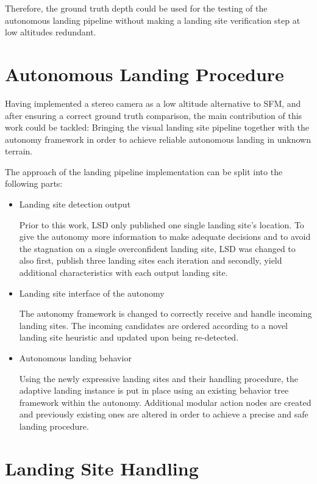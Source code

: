 Therefore, the ground truth depth could be used for the testing of the autonomous landing pipeline without making a landing site verification step at low altitudes redundant.


\section{Autonomous Landing Procedure}

Having implemented a stereo camera as a low altitude alternative to SFM, and after ensuring a correct ground truth comparison, the main contribution of this work could be tackled: Bringing the visual landing site pipeline together with the autonomy framework in order to achieve reliable autonomous landing in unknown terrain.

The approach of the landing pipeline implementation can be split into the following parts:

\begin{itemize}
    \item Landing site detection output

    Prior to this work, LSD only published one single landing site's location. To give the autonomy more information to make adequate decisions and to avoid the stagnation on a single overconfident landing site, LSD was changed to also first, publish three landing sites each iteration and secondly, yield additional characteristics with each output landing site.
    \item Landing site interface of the autonomy

    The autonomy framework is changed to correctly receive and handle incoming landing sites. The incoming candidates are ordered according to a novel landing site heuristic and updated upon being re-detected.
    \item Autonomous landing behavior

    Using the newly expressive landing sites and their handling procedure, the adaptive landing instance is put in place using an existing behavior tree framework within the autonomy. Additional modular action nodes are created and previously existing ones are altered in order to achieve a precise and safe landing procedure.
\end{itemize}

\section{Landing Site Handling}\label{subsubsec:LandingSiteHeuristic}

